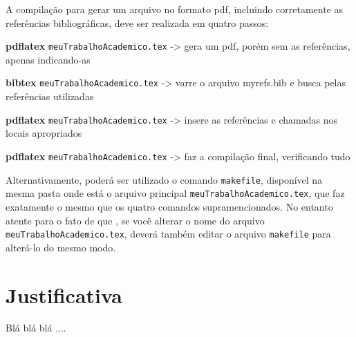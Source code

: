 A compilação para gerar um arquivo no formato pdf, incluindo corretamente as referências bibliográficas, deve ser realizada em quatro passos:

\begin{compactitem}
	\item \textbf{pdflatex} \verb|meuTrabalhoAcademico.tex|    -> gera um pdf, porém sem as referências, apenas indicando-as
	\item \textbf{bibtex} \verb|meuTrabalhoAcademico.tex|	-> varre o arquivo myrefs.bib e busca pelas referências utilizadas
	\item \textbf{pdflatex} \verb|meuTrabalhoAcademico.tex|	-> insere as referências e chamadas nos locais apropriados
	\item \textbf{pdflatex} \verb|meuTrabalhoAcademico.tex|	-> faz a compilação final, verificando tudo
\end{compactitem}

Alternativamente, poderá ser utilizado o comando \verb|makefile|, disponível na mesma pasta onde está o arquivo principal \verb|meuTrabalhoAcademico.tex|, que faz exatamente o mesmo que os quatro comandos supramencionados. No entanto atente para o fato de que , se você alterar o nome do arquivo \verb|meuTrabalhoAcademico.tex|, deverá também editar o arquivo \verb|makefile| para alterá-lo do mesmo modo.

\section{Justificativa}
\label{sec:justificativa}

Blá blá blá .... 

